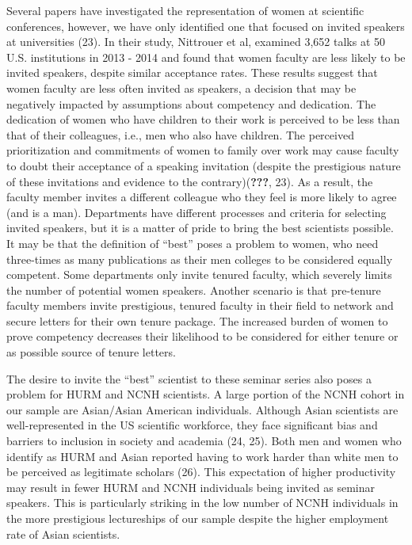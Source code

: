 \documentclass[10pt,]{article}
\begin{document}
Several papers have investigated the representation of women at
scientific conferences, however, we have only identified one that
focused on invited speakers at universities (23). In their study,
Nittrouer et al, examined 3,652 talks at 50 U.S. institutions in 2013 -
2014 and found that women faculty are less likely to be invited
speakers, despite similar acceptance rates. These results suggest that
women faculty are less often invited as speakers, a decision that may be
negatively impacted by assumptions about competency and dedication. The
dedication of women who have children to their work is perceived to be
less than that of their colleagues, i.e., men who also have children.
The perceived prioritization and commitments of women to family over
work may cause faculty to doubt their acceptance of a speaking
invitation (despite the prestigious nature of these invitations and
evidence to the contrary)({\textbf{???}}, 23). As a result, the faculty
member invites a different colleague who they feel is more likely to
agree (and is a man). Departments have different processes and criteria
for selecting invited speakers, but it is a matter of pride to bring the
best scientists possible. It may be that the definition of ``best''
poses a problem to women, who need three-times as many publications as
their men colleges to be considered equally competent. Some departments
only invite tenured faculty, which severely limits the number of
potential women speakers. Another scenario is that pre-tenure faculty
members invite prestigious, tenured faculty in their field to network
and secure letters for their own tenure package. The increased burden of
women to prove competency decreases their likelihood to be considered
for either tenure or as possible source of tenure letters.

The desire to invite the ``best'' scientist to these seminar series also
poses a problem for HURM and NCNH scientists. A large portion of the
NCNH cohort in our sample are Asian/Asian American individuals. Although
Asian scientists are well-represented in the US scientific workforce,
they face significant bias and barriers to inclusion in society and
academia (24, 25). Both men and women who identify as HURM and Asian
reported having to work harder than white men to be perceived as
legitimate scholars (26). This expectation of higher productivity may
result in fewer HURM and NCNH individuals being invited as seminar
speakers. This is particularly striking in the low number of NCNH
individuals in the more prestigious lectureships of our sample despite
the higher employment rate of Asian scientists.
\end{document}
